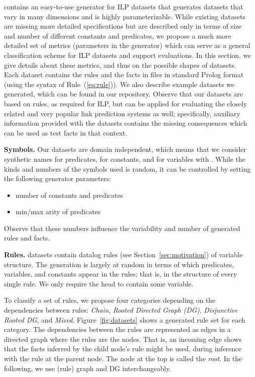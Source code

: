 \documentclass[letterpaper]{article} \usepackage{aaai20}  \usepackage{times}  \usepackage{helvet} \usepackage{courier}  \usepackage[hyphens]{url}  \usepackage{graphicx} \urlstyle{rm} \def\UrlFont{\rm}  \usepackage{graphicx}  \frenchspacing  \setlength{\pdfpagewidth}{8.5in}  \setlength{\pdfpageheight}{11in}  \usepackage{amsthm}
\theoremstyle{definition}
\newcommand{\tool}{\text{RuDaS}\xspace}
\begin{document}
\tool contains an easy-to-use generator for ILP datasets that generates datasets that vary in many dimensions and is highly parameterizable. While existing datasets are missing more detailed specifications but are described only in terms of size and number of different constants and predicates, we propose a much more detailed set of metrics (parameters in the generator) which can serve as a general classification scheme for ILP datasets and support evaluations.
In this section, we give details about these metrics, and thus on the possible shapes of \tool datasets. 
Each dataset contains the rules and the facts in files in standard Prolog format (using the syntax of Rule~(\ref{eq:rule})). We also describe example datasets we generated, which can be found in our repository. 
Observe that our datasets are based on rules, as required for ILP, but can be applied for evaluating the closely related and very popular link prediction systems as well;  specifically, auxiliary information provided with the datasets contains the missing consequences which can be used as test facts in that context.



\textbf{Symbols.} 
Our datasets are domain independent, which means that we consider synthetic names  for {predicates},  for {constants}, and  for {variables} with . While the kinds and numbers of the symbols used is random, it can be controlled by setting the following generator parameters:
\begin{itemize}
\item number of constants and predicates
\item min/max arity of predicates
\end{itemize}
Observe that these numbers influence the variability and number of generated rules and facts.








\textbf{Rules.} 
\tool datasets contain datalog {rules} (see Section~\ref{sec:motivation}) of variable structure. The generation is largely at random in terms of which predicates, variables, and constants appear in the rules; that is, in the structure of every single rule. We only require the head to contain some variable.


To classify a set of rules, we propose four categories depending on the dependencies between rules: \emph{Chain}, \emph{Rooted Directed Graph (DG)}, \emph{Disjunctive Rooted DG}, and \emph{Mixed}. 
Figure~\ref{fig:datasets} shows a generated rule set for each category. 
The dependencies between the rules are represented as edges in a directed graph where the rules are the nodes. That is, an incoming edge shows that the facts inferred by the child node's rule might be used, during inference with the rule at the parent node.
The node at the top
is called the \emph{root}. In the following, we use (rule) graph and DG interchangeably. 
\end{document}
